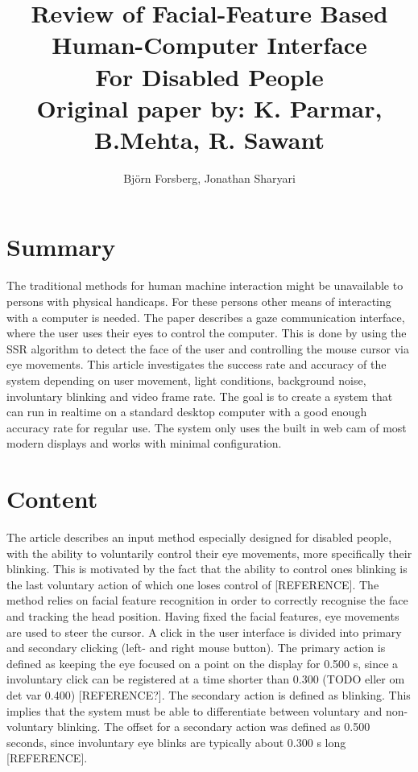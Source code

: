 \documentclass[a4paper,10pt]{article}
\title{Review of Facial-Feature Based \\
	Human-Computer Interface \\
	For Disabled People \\
	\vspace{3mm} \normalsize Original paper by: K. Parmar, B.Mehta, R. Sawant}
\author{Bj{\"o}rn Forsberg, Jonathan Sharyari}
\begin{document}
\maketitle


\section{Summary}
The traditional methods for human machine interaction might be unavailable to persons with physical handicaps. For these persons other means of interacting with a computer is needed. The paper describes a gaze communication interface, where the user uses their eyes to control the computer. This is done by using the SSR algorithm to detect the face of the user and controlling the mouse cursor via eye movements. This article investigates the success rate and accuracy of the system depending on user movement, light conditions, background noise, involuntary blinking and video frame rate.
The goal is to create a system that can run in realtime on a standard desktop computer with a good enough accuracy rate for regular use. The system only uses the built in web cam of most modern displays and works with minimal configuration.


\section{Content}
The article describes an input method especially designed for disabled people, with the ability to voluntarily control their eye movements, more specifically their blinking. This is motivated by the fact that the ability to control ones blinking is the last voluntary action of which one loses control of [REFERENCE]. The method relies on facial feature recognition in order to correctly recognise the face and tracking the head position. Having fixed the facial features, eye movements are used to steer the cursor. A click in the user interface is divided into primary and secondary clicking (left- and right mouse button). The primary action is defined as keeping the eye focused on a point on the display for 0.500 s, since a involuntary click can be registered at a time shorter than 0.300 (TODO eller om det var 0.400) [REFERENCE?]. The secondary action is defined as blinking. This implies that the system must be able to differentiate between voluntary and non-voluntary blinking. The offset for a secondary action was defined as 0.500 seconds, since involuntary eye blinks are typically about 0.300 s long [REFERENCE].
\end{document}
